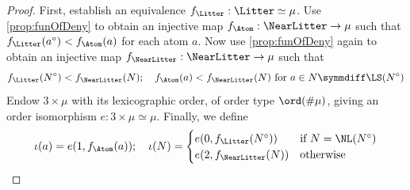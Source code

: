\begin{proof}
  \leanok
  First, establish an equivalence \( f_\Litter : \Litter \simeq \mu \).
  Use \cref{prop:funOfDeny} to obtain an injective map \( f_\Atom : \NearLitter \to \mu \) such that \( f_\Litter(a^\circ) < f_\Atom(a) \) for each atom \( a \).
  Now use \cref{prop:funOfDeny} again to obtain an injective map \( f_\NearLitter : \NearLitter \to \mu \) such that
  \[ f_\Litter(N^\circ) < f_\NearLitter(N);\quad f_\Atom(a) < f_\NearLitter(N) \text{ for } a \in N \symmdiff \LS(N^\circ) \]
  Endow \( 3 \times \mu \) with its lexicographic order, of order type \( \ord(\#\mu) \), giving an order isomorphism \( e : 3 \times \mu \simeq \mu \).
  Finally, we define
  \[ \iota(a) = e(1, f_\Atom(a));\quad \iota(N) = \begin{cases}
    e(0, f_\Litter(N^\circ)) & \text{if } N = \NL(N^\circ) \\
    e(2, f_\NearLitter(N)) & \text{otherwise}
  \end{cases} \]
\end{proof}

